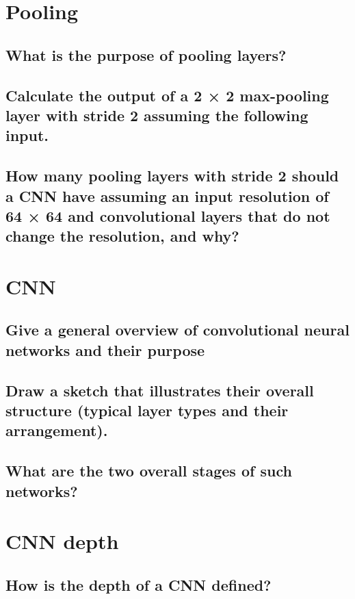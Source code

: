 \section{Pooling}

\subsection{What is the purpose of pooling layers?}

\subsection{Calculate the output of a 2 × 2 max-pooling layer with stride 2 assuming the following input.}

\subsection{How many pooling layers with stride 2 should a CNN have assuming an input resolution of 64 × 64 and convolutional layers that do not change the resolution, and why?}

\section{CNN}

\subsection{Give a general overview of convolutional neural networks and their purpose}

\subsection{Draw a sketch that illustrates their overall structure (typical layer types and their arrangement).}

\subsection{What are the two overall stages of such networks?}

\section{CNN depth}

\subsection{How is the depth of a CNN defined?}

